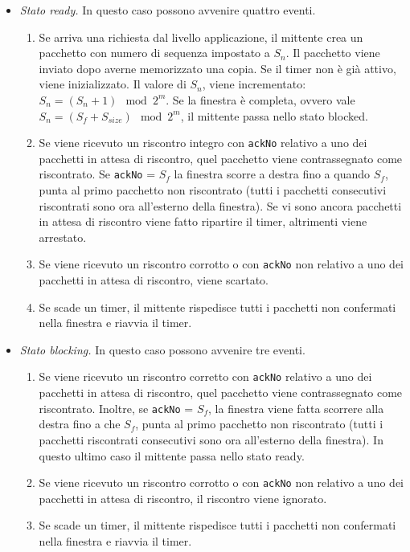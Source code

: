 \begin{itemize}
    \item \textit{Stato ready.} In questo caso possono avvenire quattro eventi.
    \begin{enumerate}
        \item Se arriva una richiesta dal livello applicazione, il mittente crea un pacchetto con numero di sequenza impostato a $S_n$. Il pacchetto viene inviato dopo averne memorizzato una copia. Se il timer non è già attivo, viene inizializzato. Il valore di $S_n$, viene incrementato: $S_n = (S_n+1) \mod 2^m$. Se la finestra è completa, ovvero vale $S_n = (S_f+S_{size}) \mod 2^m$, il mittente passa nello stato blocked.
        \item Se viene ricevuto un riscontro integro con \verb|ackNo| relativo a uno dei pacchetti in attesa di riscontro, quel pacchetto viene contrassegnato come riscontrato. Se \verb|ackNo| = $S_f$ la finestra scorre a destra fino a quando $S_f$, punta al primo pacchetto non riscontrato (tutti i pacchetti consecutivi riscontrati sono ora all'esterno della finestra). Se vi sono ancora pacchetti in attesa di riscontro viene fatto ripartire il timer, altrimenti viene arrestato.
        \item Se viene ricevuto un riscontro corrotto o con \verb|ackNo| non relativo a uno dei pacchetti in attesa di riscontro, viene scartato.
        \item Se scade un timer, il mittente rispedisce tutti i pacchetti non confermati nella finestra e riavvia il timer.
    \end{enumerate}
    \item \textit{Stato blocking.} In questo caso possono avvenire tre eventi.
    \begin{enumerate}
        \item Se viene ricevuto un riscontro corretto con \verb|ackNo| relativo a uno dei pacchetti in attesa di riscontro, quel pacchetto viene contrassegnato come riscontrato. Inoltre, se \verb|ackNo| = $S_f$, la finestra viene fatta scorrere alla destra fino a che $S_f$, punta al primo pacchetto non riscontrato (tutti i pacchetti riscontrati consecutivi sono ora all'esterno della finestra). In questo ultimo caso il mittente passa nello stato ready.
        \item Se viene ricevuto un riscontro corrotto o con \verb|ackNo| non relativo a uno dei pacchetti in attesa di riscontro, il riscontro viene ignorato.
        \item Se scade un timer, il mittente rispedisce tutti i pacchetti non confermati nella finestra e riavvia il timer.
    \end{enumerate}
\end{itemize}

